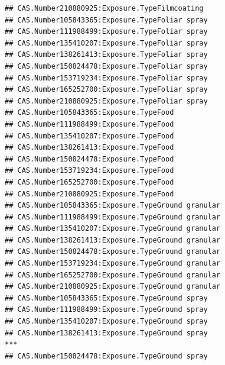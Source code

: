 \documentclass[
  12pt,
]{article}
\begin{document}
\begin{verbatim}
## CAS.Number210880925:Exposure.TypeFilmcoating                                       
## CAS.Number105843365:Exposure.TypeFoliar spray                                      
## CAS.Number111988499:Exposure.TypeFoliar spray                                      
## CAS.Number135410207:Exposure.TypeFoliar spray                                      
## CAS.Number138261413:Exposure.TypeFoliar spray                                      
## CAS.Number150824478:Exposure.TypeFoliar spray                                      
## CAS.Number153719234:Exposure.TypeFoliar spray                                      
## CAS.Number165252700:Exposure.TypeFoliar spray                                      
## CAS.Number210880925:Exposure.TypeFoliar spray                                      
## CAS.Number105843365:Exposure.TypeFood                                              
## CAS.Number111988499:Exposure.TypeFood                                              
## CAS.Number135410207:Exposure.TypeFood                                              
## CAS.Number138261413:Exposure.TypeFood                                              
## CAS.Number150824478:Exposure.TypeFood                                              
## CAS.Number153719234:Exposure.TypeFood                                              
## CAS.Number165252700:Exposure.TypeFood                                              
## CAS.Number210880925:Exposure.TypeFood                                              
## CAS.Number105843365:Exposure.TypeGround granular                                   
## CAS.Number111988499:Exposure.TypeGround granular                                   
## CAS.Number135410207:Exposure.TypeGround granular                                   
## CAS.Number138261413:Exposure.TypeGround granular                                   
## CAS.Number150824478:Exposure.TypeGround granular                                   
## CAS.Number153719234:Exposure.TypeGround granular                                   
## CAS.Number165252700:Exposure.TypeGround granular                                   
## CAS.Number210880925:Exposure.TypeGround granular                                   
## CAS.Number105843365:Exposure.TypeGround spray                                      
## CAS.Number111988499:Exposure.TypeGround spray                                      
## CAS.Number135410207:Exposure.TypeGround spray                                      
## CAS.Number138261413:Exposure.TypeGround spray                                   ***
## CAS.Number150824478:Exposure.TypeGround spray                                      

\end{verbatim}
\end{document}
